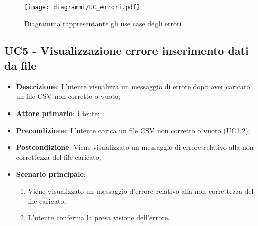 \begin{figure}[h]
    \centering
    \texttt{[image: diagrammi/UC\_errori.pdf]}
    \caption{Diagramma rappresentante gli use case degli errori}
    \label{fig:UC5}
\end{figure}


\subsection{UC5 - Visualizzazione errore inserimento dati da file}
\label{sub:uc6}
\begin{itemize}
    \item \textbf{Descrizione}: L'utente visualizza un messaggio di errore dopo aver caricato un file CSV non corretto 
    o vuoto;

    \item \textbf{Attore primario}: Utente;
    
    \item \textbf{Precondizione}:   L'utente carica un file CSV non corretto o vuoto (\hyperref[ssub:uc1.2]{UC1.2});

    \item \textbf{Postcondizione}:  Viene visualizzato un messaggio di errore relativo alla non correttezza del file 
    caricato;

    \item \textbf{Scenario principale}:
    \begin{enumerate}
        \item Viene visualizzato un messaggio d'errore relativo alla non correttezza del file caricato;
        \item L'utente conferma la presa visione dell'errore.
    \end{enumerate}

\end{itemize}



